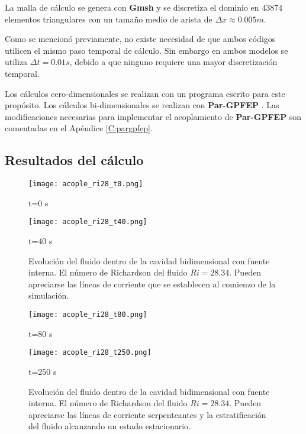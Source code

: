 La malla de cálculo se genera con \textbf{Gmsh} \cite{gmsh} y se discretiza el dominio en $43874$ elementos triangulares con un tamaño medio de arista de $\Delta x \approx 0.005m$. 

Como se mencionó previamente, no existe necesidad de que ambos códigos utilicen el mismo paso temporal de cálculo.
Sin embargo en ambos modelos se utiliza $\Delta t=0.01s$, debido a que ninguno requiere una mayor discretización temporal.

Los cálculos cero-dimensionales se realizan con un programa escrito para este propósito.
Los cálculos bi-dimensionales se realizan con \textbf{Par-GPFEP} \cite{gpfep} \cite{pargpfep}.
Las modificaciones necesarias para implementar el acoplamiento de \textbf{Par-GPFEP} son comentadas en el Apéndice \ref{C:pargpfep}.

\subsection*{Resultados del cálculo}

\begin{figure}[ht]
	\begin{minipage}{0.5\linewidth}
		\centering
		\texttt{[image: acople\_ri28\_t0.png]}
		\caption[]{t=0 s}
		\label{asd}	
	\end{minipage}
	\begin{minipage}{0.5\linewidth}
		\centering
		\texttt{[image: acople\_ri28\_t40.png]}
		\caption[]{t=40 s}
		\label{asd}	
	\end{minipage}
	\caption[Evolución en el transitorio inicial del fluido dentro de la cavidad bidimensional con fuente interna]
  {Evolución del fluido dentro de la cavidad bidimensional con fuente interna.
	El número de Richardson del fluido $Ri=28.34$.
	Pueden apreciarse las líneas de corriente que se establecen al comienzo de la simulación.} 
	\label{acople_ri28_1}
\end{figure}

\begin{figure}[ht]
	\begin{minipage}{0.5\linewidth}
		\centering
		\texttt{[image: acople\_ri28\_t80.png]}
		\caption[]{t=80 s}
		\label{asd}	
	\end{minipage}
	\begin{minipage}{0.5\linewidth}
		\centering
		\texttt{[image: acople\_ri28\_t250.png]}
		\caption[]{t=250 s}
		\label{asd}	
	\end{minipage}
	\caption[Evolución hacia el estado estacionario del fluido dentro de la cavidad bidimensional con fuente interna]
  {Evolución del fluido dentro de la cavidad bidimensional con fuente interna.
	El número de Richardson del fluido $Ri=28.34$.
	Pueden apreciarse las líneas de corriente serpenteantes y la estratificación del fluido alcanzando un estado estacionario.}  
	\label{acople_ri28_2}
\end{figure}

